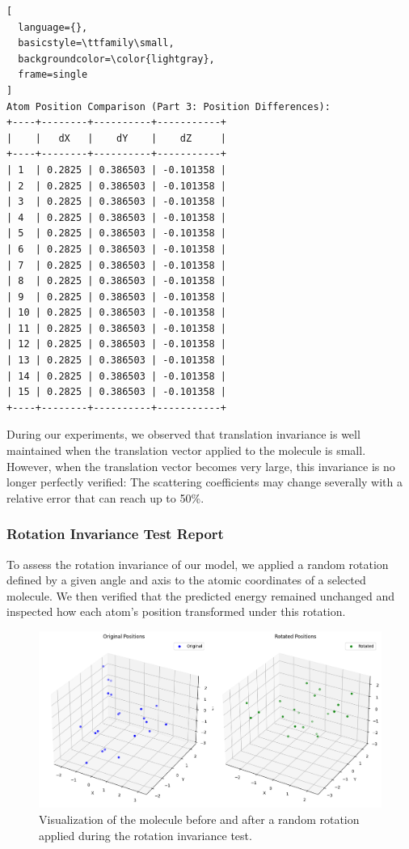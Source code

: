 \documentclass{article}
\begin{document}
\begin{lstlisting}[
  language={},
  basicstyle=\ttfamily\small,
  backgroundcolor=\color{lightgray},
  frame=single
]
Atom Position Comparison (Part 3: Position Differences):
+----+--------+----------+-----------+
|    |   dX   |    dY    |    dZ     |
+----+--------+----------+-----------+
| 1  | 0.2825 | 0.386503 | -0.101358 |
| 2  | 0.2825 | 0.386503 | -0.101358 |
| 3  | 0.2825 | 0.386503 | -0.101358 |
| 4  | 0.2825 | 0.386503 | -0.101358 |
| 5  | 0.2825 | 0.386503 | -0.101358 |
| 6  | 0.2825 | 0.386503 | -0.101358 |
| 7  | 0.2825 | 0.386503 | -0.101358 |
| 8  | 0.2825 | 0.386503 | -0.101358 |
| 9  | 0.2825 | 0.386503 | -0.101358 |
| 10 | 0.2825 | 0.386503 | -0.101358 |
| 11 | 0.2825 | 0.386503 | -0.101358 |
| 12 | 0.2825 | 0.386503 | -0.101358 |
| 13 | 0.2825 | 0.386503 | -0.101358 |
| 14 | 0.2825 | 0.386503 | -0.101358 |
| 15 | 0.2825 | 0.386503 | -0.101358 |
+----+--------+----------+-----------+
\end{lstlisting}


During our experiments, we observed that translation invariance is well maintained when the translation vector applied to the molecule is small. However, when the translation vector becomes very large, this invariance is no longer perfectly verified: The scattering coefficients may change severally with a relative error that can reach up to 50\%.

\subsubsection{Rotation Invariance Test Report}


To assess the rotation invariance of our model, we applied a random rotation defined by a given angle and axis to the atomic coordinates of a selected molecule. We then verified that the predicted energy remained unchanged and inspected how each atom's position transformed under this rotation.


\begin{figure}[H]
  \centering
  \includegraphics[width=0.9\linewidth]{Images_Ayoub/Invariance/Scattering/Rotation.png}
  \caption{Visualization of the molecule before and after a random rotation applied during the rotation invariance test.}
  \label{fig:rotation_invariance_visualization}
\end{figure}
\end{document}
